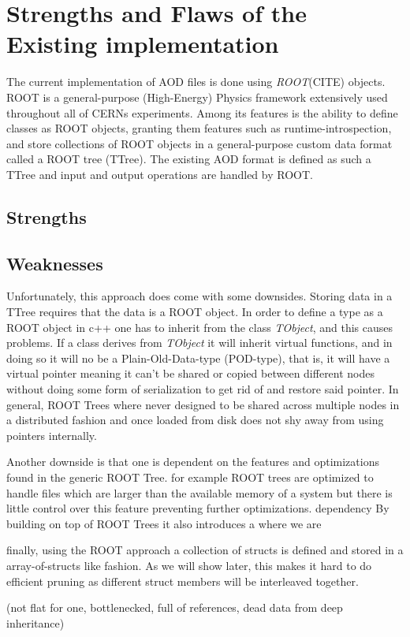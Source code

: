 \documentclass[a4paper]{report}
\begin{document}
\chapter{Strengths and Flaws of the Existing implementation}
The current implementation of AOD files is done using {\em ROOT}(CITE) objects. ROOT is a general-purpose (High-Energy) Physics framework extensively used throughout
all of CERNs experiments. Among its features is the ability to define classes as ROOT objects, granting them
features such as runtime-introspection, and store collections of ROOT objects in a general-purpose custom data format called a ROOT tree (TTree).
 The existing AOD format is defined as such a TTree and input and output operations are handled by ROOT.
 
\section{Strengths}

\section{Weaknesses}
Unfortunately, this approach does come with some downsides. Storing data in a TTree requires that the data is a ROOT object. In order to define a type as a ROOT object in c++
one has to inherit from the class {\em TObject}, and this causes problems. If a class derives from {\em TObject} it will inherit virtual functions, and in doing so it will no be a
Plain-Old-Data-type (POD-type), that is, it will have a virtual pointer meaning it can't be shared or copied between different nodes without doing some form of serialization to get rid of and
restore said pointer. In general, ROOT Trees where never designed to be shared across multiple nodes in a distributed fashion and once loaded from disk does not shy away from using
pointers internally.

Another downside is that one is dependent on the features and optimizations found in the generic ROOT Tree.  for example ROOT trees are optimized to handle files which are larger
than the available memory of a system but there is little control over this feature preventing further optimizations. dependency By building on top of ROOT Trees it also introduces a
where we are

finally, using the ROOT approach a collection of structs is defined and stored in a array-of-structs like fashion. As we will show later, this makes it hard to do efficient pruning
as different struct members will be interleaved together.

(not flat for one, bottlenecked, full of references, dead data from deep inheritance)
\end{document}
